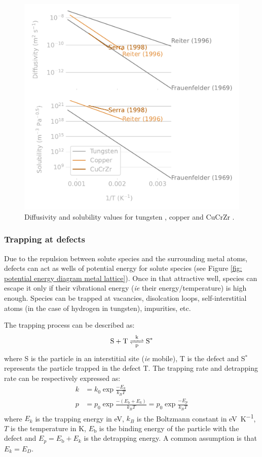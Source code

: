 \begin{figure}
    \centering
    \includegraphics[width=0.75\linewidth]{Figures/Chapter1/diffusivity_solubility_materials.pdf}
    \caption{Diffusivity and solubility values for tungsten \cite{reiter_compilation_1996,frauenfelder_solution_1969}, copper \cite{reiter_compilation_1996} and CuCrZr \cite{serra_hydrogen_1998}.}
\end{figure}

\subsubsection{Trapping at defects}

Due to the repulsion between solute species and the surrounding metal atoms, defects can act as wells of potential energy for solute species (see Figure \ref{fig: potential energy diagram metal lattice}).
Once in that attractive well, species can escape it only if their vibrational energy (\textit{ie} their energy/temperature) is high enough.
Species can be trapped at vacancies, disolcation loops, self-interstitial atoms (in the case of hydrogen in tungsten), impurities, etc.

The trapping process can be described as:
\begin{equation}
    \ce{S + T <=>[k][p] S^*}
\end{equation}
where S is the particle in an interstitial site (\textit{ie} mobile), T is the defect and S$^*$ represents the particle trapped in the defect T.
The trapping rate and detrapping rate can be respectively expressed as:
\begin{align}
    k &= k_0 \exp{\frac{-E_k}{k_B T}} \\
    p &= p_0 \exp{\frac{-(E_\mathrm{b} + E_k)}{k_B T}} = p_0 \exp{\frac{-E_p}{k_B T}}
\end{align}
where $E_k$ is the trapping energy in \si{eV}, $k_B$ is the Boltzmann constant in \si{eV.K^{-1}}, $T$ is the temperature in \si{K}, $E_\mathrm{b}$ is the binding energy of the particle with the defect and $E_p = E_\mathrm{b} + E_k$ is the detrapping energy.
A common assumption is that $E_k = E_D$.

